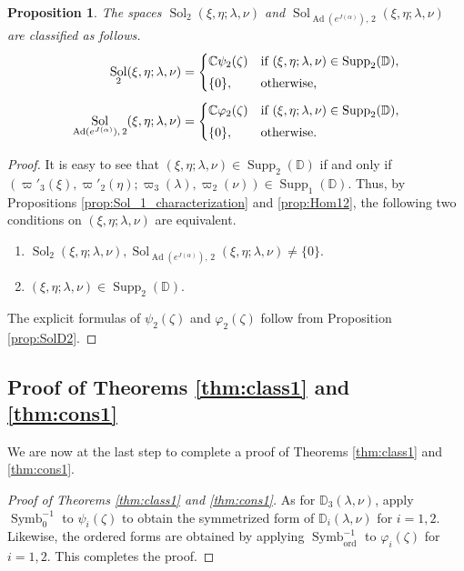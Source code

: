 \documentclass[a4paper,11pt,reqno]{amsart}
\newcommand{\DD}{\mathbb{D}}
\newcommand{\0}{{\bf 0}}
\newcommand{\C}{\mathbb{C}}
\newcommand{\1}{{\bf 1}}
\DeclareMathOperator{\Ad}{Ad}
\newcommand{\ord}{{\mathrm{ord}}}
\DeclareMathOperator{\Supp}{Supp}
\DeclareMathOperator{\Sol}{Sol}
\DeclareMathOperator{\Symb}{Symb}
\theoremstyle{plain}
\newtheorem{proposition}[equation]{Proposition}
\theoremstyle{definition}
\numberwithin{equation}{section}
\theoremstyle{definition}
\begin{document}
\begin{proposition}\label{prop:Sol_2_characterization}
The spaces $\Sol_2(\xi, \eta; \lambda, \nu)$ and 
$\Sol_{\Ad(e^{J(\alpha)}),\, 2}(\xi,\eta; \lambda,\nu)$ are classified as follows.
\begin{align*}
\Sol_2(\xi, \eta; \lambda, \nu) 
&= 
\begin{cases}
\C\psi_2(\zeta) & \textnormal{if $(\xi, \eta; \lambda, \nu) \in \Supp_{2}(\DD)$},\\[3pt]
\{0\}, & \textnormal{otherwise,}
\end{cases}\\[3pt]
\Sol_{\Ad(e^{J(\alpha)}),\, 2}(\xi,\eta; \lambda,\nu)
&= 
\begin{cases}
\C\varphi_2(\zeta) & \textnormal{if $(\xi, \eta; \lambda, \nu) \in \Supp_{2}(\DD)$},\\[3pt]
\{0\}, & \textnormal{otherwise}.
\end{cases}
\end{align*}
\end{proposition}

\begin{proof}
It is easy to see that $(\xi,\eta; \lambda,\nu) \in \Supp_2(\DD)$
if and only if 
$(\varpi'_3(\xi), \varpi'_2(\eta); \varpi_3(\lambda), \varpi_2(\nu)) \in \Supp_1(\DD)$.
Thus, by Propositions \ref{prop:Sol_1_characterization} and
\ref{prop:Hom12}, the following two conditions on $(\xi, \eta; \lambda, \nu)$ 
are equivalent.
\begin{enumerate}[label=\normalfont{(\roman*)}]
\item $\Sol_2(\xi, \eta; \lambda, \nu),
\Sol_{\Ad(e^{J(\alpha)}),\, 2}(\xi,\eta; \lambda,\nu)\neq \{0\}$.
\item $(\xi,\eta; \lambda,\nu) \in \Supp_2(\DD)$.
\end{enumerate}
The explicit formulas of $\psi_2(\zeta)$ and $\varphi_2(\zeta)$ 
follow from Proposition \ref{prop:SolD2}. 
\end{proof}

\subsection{Proof of Theorems \texorpdfstring{\ref{thm:class1}}{9.7} and \texorpdfstring{\ref{thm:cons1}}{9.9}}
\label{sec:proof12}

We are now at the last step to complete 
a proof of Theorems \ref{thm:class1} and \ref{thm:cons1}.

\begin{proof}[Proof of  Theorems \ref{thm:class1} and \ref{thm:cons1}]
As for $\DD_{3}(\lambda,\nu)$, apply
 $\Symb_0^{-1}$ to $\psi_i(\zeta)$ to obtain 
the symmetrized form of $\DD_{i}(\lambda,\nu)$ for $i=1,2$.
Likewise, the ordered forms are obtained by applying 
 $\Symb_{\ord}^{-1}$ to $\varphi_i(\zeta)$ for $i=1,2$.
 This completes the proof. 
\end{proof}
\end{document}
